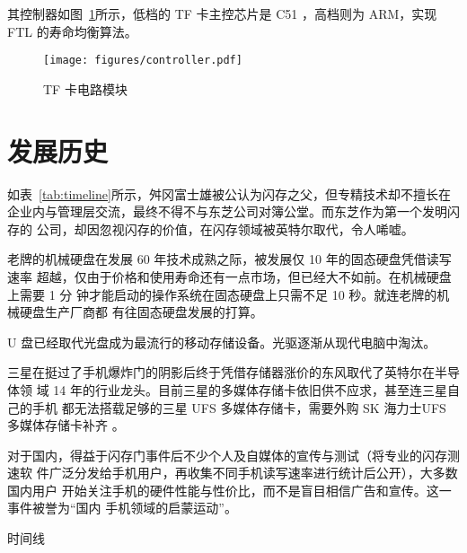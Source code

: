 \documentclass[../main]{subfiles}
\begin{document}
其控制器如图~\ref{fig:controller}所示，低档的 TF 卡主控芯片是 C51 ，高档则为
ARM，实现 FTL 的寿命均衡算法。

\begin{figure}[htbp]
  \centering
  \texttt{[image: figures/controller.pdf]}
  \caption{TF 卡电路模块}%
  \label{fig:controller}
\end{figure}

\section{发展历史}%
\label{sec:development_history}

如表~\ref{tab:timeline}所示，舛冈富士雄被公认为闪存之父，但专精技术却不擅长在
企业内与管理层交流，最终不得不与东芝公司对簿公堂。而东芝作为第一个发明闪存的
公司，却因忽视闪存的价值，在闪存领域被英特尔取代，令人唏嘘。

老牌的机械硬盘在发展 60 年技术成熟之际，被发展仅 10 年的固态硬盘凭借读写速率
超越，仅由于价格和使用寿命还有一点市场，但已经大不如前。在机械硬盘上需要 1 分
钟才能启动的操作系统在固态硬盘上只需不足 10 秒。就连老牌的机械硬盘生产厂商都
有往固态硬盘发展的打算。

U 盘已经取代光盘成为最流行的移动存储设备。光驱逐渐从现代电脑中淘汰。

三星在挺过了手机爆炸门的阴影后终于凭借存储器涨价的东风取代了英特尔在半导体领
域 14 年的行业龙头。目前三星的多媒体存储卡依旧供不应求，甚至连三星自己的手机
都无法搭载足够的三星 UFS 多媒体存储卡，需要外购 SK 海力士UFS 多媒体存储卡补齐
。

对于国内，得益于闪存门事件后不少个人及自媒体的宣传与测试（将专业的闪存测速软
件广泛分发给手机用户，再收集不同手机读写速率进行统计后公开），大多数国内用户
开始关注手机的硬件性能与性价比，而不是盲目相信广告和宣传。这一事件被誉为“国内
手机领域的启蒙运动”。

\begin{table}
  \centering
  \caption{时间线}%
  \label{tab:timeline}
\end{table}
\end{document}
